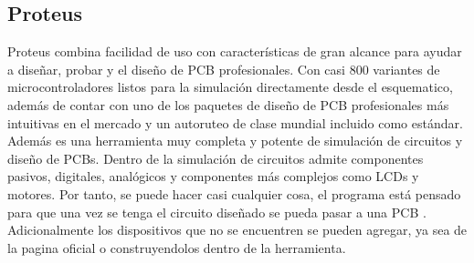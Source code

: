 \subsection{Proteus}

Proteus combina facilidad de uso con características de gran alcance para ayudar a diseñar, probar y el diseño de PCB profesionales. Con casi 800 variantes de microcontroladores listos para la simulación directamente desde el esquematico, además de contar con uno de los paquetes de diseño de PCB profesionales más intuitivas en el mercado y un autoruteo de clase mundial incluido como estándar. \cite{Prot1} \\

Además es una herramienta muy completa y potente de simulación de circuitos y diseño de PCBs. Dentro de la simulación de circuitos admite componentes pasivos, digitales, analógicos y componentes más complejos como LCDs y motores. Por tanto, se puede hacer casi cualquier cosa, el programa está pensado para que una vez se tenga el circuito diseñado se pueda pasar a una PCB \cite{Prot2}.
Adicionalmente los dispositivos que no se encuentren se pueden agregar, ya sea de la pagina oficial o construyendolos dentro de la herramienta.
